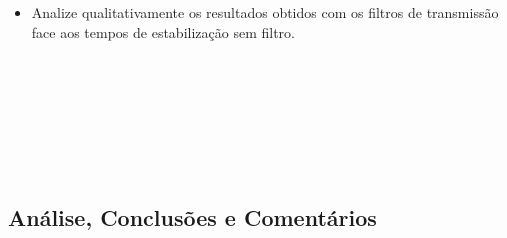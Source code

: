 \documentclass[a4paper,12pt]{article}  %
\begin{document}
\begin{itemize}
\item Analize qualitativamente os resultados obtidos com os filtros de transmissão face aos tempos de estabilização sem filtro.
\end{itemize}

\noindent\underline{\makebox[\textwidth][r]{~}} \\
\noindent\underline{\makebox[\textwidth][r]{~}} \\
\noindent\underline{\makebox[\textwidth][r]{~}} \\
\noindent\underline{\makebox[\textwidth][r]{~}} \\
\noindent\underline{\makebox[\textwidth][r]{~}} \\
\noindent\underline{\makebox[\textwidth][r]{~}} \\
\noindent\underline{\makebox[\textwidth][r]{~}} 


\subsection{\sf Análise, Conclusões e Comentários}
\noindent\underline{\makebox[\textwidth][r]{~}} \\
\noindent\underline{\makebox[\textwidth][r]{~}} \\
\noindent\underline{\makebox[\textwidth][r]{~}} \\
\noindent\underline{\makebox[\textwidth][r]{~}} \\
\noindent\underline{\makebox[\textwidth][r]{~}} \\
\noindent\underline{\makebox[\textwidth][r]{~}} \\
\noindent\underline{\makebox[\textwidth][r]{~}} \\
\noindent\underline{\makebox[\textwidth][r]{~}} \\
\noindent\underline{\makebox[\textwidth][r]{~}} \\
\noindent\underline{\makebox[\textwidth][r]{~}} \\
\noindent\underline{\makebox[\textwidth][r]{~}} \\
\noindent\underline{\makebox[\textwidth][r]{~}} \\
\noindent\underline{\makebox[\textwidth][r]{~}} \\
\noindent\underline{\makebox[\textwidth][r]{~}} \\
\noindent\underline{\makebox[\textwidth][r]{~}} \\




\end{document}
